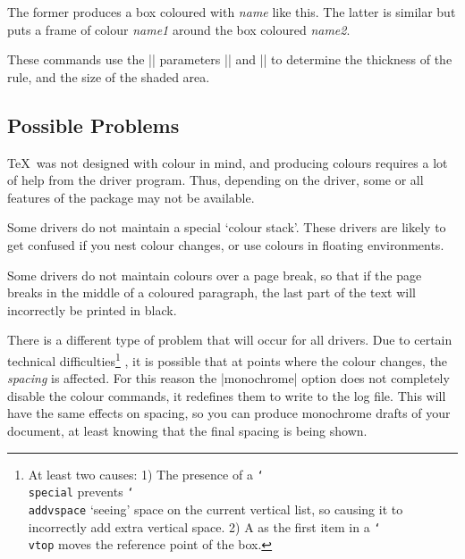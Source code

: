 

The former produces a box coloured with \emph{name}
\colorbox{mygrey}{like this}. The latter is similar but puts a frame of
colour \emph{name1} around the box coloured \emph{name2}.

These commands use the |\fbox| parameters |\fboxrule| and |\fboxsep|
to determine the thickness of the rule, and the size of the shaded area.

\subsection{Possible Problems}

\TeX\ was not designed with colour in mind, and producing colours
requires a lot of help from the driver program. Thus, depending on the
driver, some or all features of the  package may not be
available.

Some drivers do not maintain a special `colour stack'. These drivers are
likely to get confused if you nest colour changes, or use colours in
floating environments.

Some drivers do not maintain colours over a page break, so that if the
page breaks in the middle of a coloured paragraph, the last part of the
text will incorrectly be printed in black.

There is a different type of problem that will occur for all drivers.
Due to certain technical difficulties\footnote{At least two causes:
1) The presence of a \texttt{\char`\\special}  prevents
\texttt{\char`\\addvspace} `seeing' space on the current vertical list,
so causing it to incorrectly add extra vertical space. 2) A
 as the first item in a \texttt{\char`\\vtop} moves the
reference point of the box.}%
, it is possible that at points
where the colour changes, the \emph{spacing} is affected. For this
reason the |monochrome| option does not completely disable the colour
commands, it redefines them to write to the log file. This will have the
same effects on spacing, so you can produce monochrome drafts of your
document, at least knowing that the final spacing is being shown.
